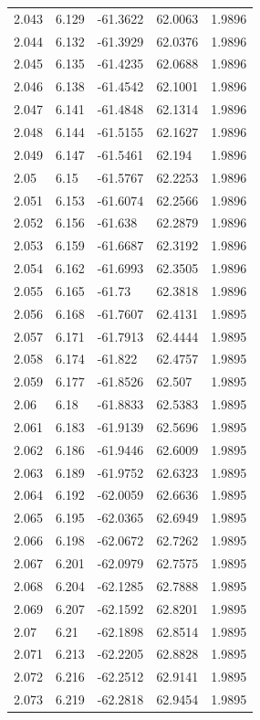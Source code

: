 \begin{tabular}{lllll}
2.043 & 6.129 & -61.3622 & 62.0063 & 1.9896 \\
2.044 & 6.132 & -61.3929 & 62.0376 & 1.9896 \\
2.045 & 6.135 & -61.4235 & 62.0688 & 1.9896 \\
2.046 & 6.138 & -61.4542 & 62.1001 & 1.9896 \\
2.047 & 6.141 & -61.4848 & 62.1314 & 1.9896 \\
2.048 & 6.144 & -61.5155 & 62.1627 & 1.9896 \\
2.049 & 6.147 & -61.5461 & 62.194 & 1.9896 \\
2.05 & 6.15 & -61.5767 & 62.2253 & 1.9896 \\
2.051 & 6.153 & -61.6074 & 62.2566 & 1.9896 \\
2.052 & 6.156 & -61.638 & 62.2879 & 1.9896 \\
2.053 & 6.159 & -61.6687 & 62.3192 & 1.9896 \\
2.054 & 6.162 & -61.6993 & 62.3505 & 1.9896 \\
2.055 & 6.165 & -61.73 & 62.3818 & 1.9896 \\
2.056 & 6.168 & -61.7607 & 62.4131 & 1.9895 \\
2.057 & 6.171 & -61.7913 & 62.4444 & 1.9895 \\
2.058 & 6.174 & -61.822 & 62.4757 & 1.9895 \\
2.059 & 6.177 & -61.8526 & 62.507 & 1.9895 \\
2.06 & 6.18 & -61.8833 & 62.5383 & 1.9895 \\
2.061 & 6.183 & -61.9139 & 62.5696 & 1.9895 \\
2.062 & 6.186 & -61.9446 & 62.6009 & 1.9895 \\
2.063 & 6.189 & -61.9752 & 62.6323 & 1.9895 \\
2.064 & 6.192 & -62.0059 & 62.6636 & 1.9895 \\
2.065 & 6.195 & -62.0365 & 62.6949 & 1.9895 \\
2.066 & 6.198 & -62.0672 & 62.7262 & 1.9895 \\
2.067 & 6.201 & -62.0979 & 62.7575 & 1.9895 \\
2.068 & 6.204 & -62.1285 & 62.7888 & 1.9895 \\
2.069 & 6.207 & -62.1592 & 62.8201 & 1.9895 \\
2.07 & 6.21 & -62.1898 & 62.8514 & 1.9895 \\
2.071 & 6.213 & -62.2205 & 62.8828 & 1.9895 \\
2.072 & 6.216 & -62.2512 & 62.9141 & 1.9895 \\
2.073 & 6.219 & -62.2818 & 62.9454 & 1.9895 \\

\end{tabular}
